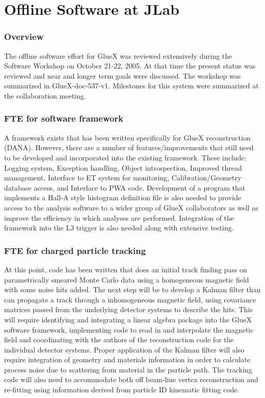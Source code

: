 \documentclass[10pt]{article}
\begin{document}
\section*{Offline Software at JLab} 


\subsubsection*{Overview}

The offline software effort for GlueX was reviewed extensively during
the Software Workshop on October 21-22, 2005. 
At that time  the present
status was reviewed and near and longer term goals were discussed. 
The workshop was summarized in GlueX-doc-537-v1.  
Milestones 
for this system were summarized at the collaboration meeting. 


\subsubsection*{FTE for software framework}

A framework exists that has been written specifically for GlueX
reconstruction (DANA). However, there are a number of
features/improvements that still need to be developed and incorporated
into the existing framework. These include: Logging system, Exception
handling, Object introspection, Improved thread management, Interface to
ET system for monitoring, Calibration/Geometry database access, and
Interface to PWA code. Development of a program that implements a Hall-A
style histogram definition file is also needed to provide access to the
analysis software to a wider group of GlueX collaborators as well as
improve the efficiency in which analyses are performed. Integration of
the framework into the L3 trigger is also needed along with extensive
testing.


\subsubsection*{FTE for charged particle tracking}

At this point, code has been written that does an initial track finding
pass on parametrically smeared Monte Carlo data using a homogeneous
magnetic field with some noise hits added. The next step will be to
develop a Kalman filter than can propagate a track through a
inhomogeneous magnetic field, using covariance matrices passed from the
underlying detector systems to describe the hits. This will require
identifying and integrating a linear algebra package into the GlueX
software framework, implementing code to read in and interpolate the
magnetic field and coordinating with the authors of the  reconstruction
code for the  individual detector systems.  Proper  application of the
Kalman filter will also require integration of geometry and materials
information in order to calculate process noise due to scattering from
material in the particle path. The tracking code will also need to
accommodate both off beam-line vertex reconstruction and re-fitting
using information
derived from particle ID kinematic fitting code.
\end{document}
